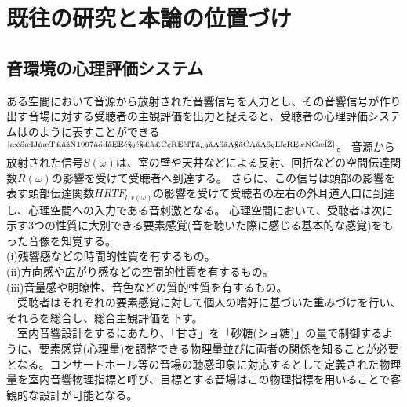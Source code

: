 \newpage
\section{既往の研究と本論の位置づけ}

\subsection{音環境の心理評価システム}
ある空間において音源から放射された音響信号を入力とし、その音響信号が作り出す音場に対する受聴者の主観評価を出力と捉えると、受聴者の心理評価システムはのように表すことができる$^{\text{\cite{森本政之1997室内音響心理評価のための物理指標}}}$。
音源から放射された信号$S(\omega)$は、室の壁や天井などによる反射、回折などの空間伝達関数$R(\omega)$の影響を受けて受聴者へ到達する。
さらに、この信号は頭部の影響を表す頭部伝達関数$HRTF_{l,r(\omega)}$の影響を受けて受聴者の左右の外耳道入口に到達し、心理空間への入力である音刺激となる。
心理空間において、受聴者は次に示す3つの性質に大別できる要素感覚(音を聴いた際に感じる基本的な感覚)をもった音像を知覚する。
\\(i)残響感などの時間的性質を有するもの。
\\(i\hspace{-.05em}i)方向感や広がり感などの空間的性質を有するもの。
\\(i\hspace{-.05em}i\hspace{-.05em}i)音量感や明瞭性、音色などの質的性質を有するもの。
\\　受聴者はそれぞれの要素感覚に対して個人の嗜好に基づいた重みづけを行い、それらを総合し、総合主観評価を下す。
\\　室内音響設計をするにあたり、「甘さ」を「砂糖(ショ糖)」の量で制御するように、要素感覚(心理量)を調整できる物理量並びに両者の関係を知ることが必要となる。コンサートホール等の音場の聴感印象に対応するとして定義された物理量を室内音響物理指標と呼び、目標とする音場はこの物理指標を用いることで客観的な設計が可能となる。\\

